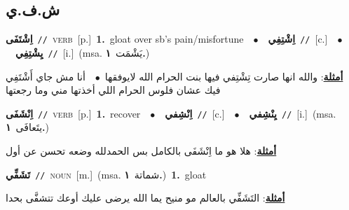 \documentclass[10pt,a4paper,twoside]{article} %
\begin{document}
\begin{multicols}{2}
\vspace{-3mm}
\subsection*{\color{blue}\foreignlanguage{arabic}{ش.ف.ي}\color{blue}{}} 

{\setlength\topsep{0pt}\textbf{\foreignlanguage{arabic}{اِشْتَفَى}}\ {\color{gray}\texttt{//}\color{black}}\ \textsc{verb}\ [p.]\ \textbf{1.}~gloat over sb's pain/misfortune\ \ $\bullet$\ \ \setlength\topsep{0pt}\textbf{\foreignlanguage{arabic}{اِشْتِفِي}}\ {\color{gray}\texttt{//}\color{black}}\ [c.]\ \ $\bullet$\ \ \setlength\topsep{0pt}\textbf{\foreignlanguage{arabic}{يِشْتِفِي}}\ {\color{gray}\texttt{//}\color{black}}\ [i.]\ \color{gray}(msa. \foreignlanguage{arabic}{يَشْمَت}~\foreignlanguage{arabic}{\textbf{١.}})\color{black}\  \begin{flushright}\color{gray}\foreignlanguage{arabic}{\textbf{\underline{\foreignlanguage{arabic}{أمثلة}}}: والله انها صارت تِشْتِفي فيها بنت الحرام الله لايوفقها\ $\bullet$\ \  أنا مش جاي أَشْتَفِي فيك عشان فلوس الحرام اللي أخذتها مني وما رجعتها}\end{flushright}\color{black}} \vspace{2mm}

{\setlength\topsep{0pt}\textbf{\foreignlanguage{arabic}{اِنْشَفَى}}\ {\color{gray}\texttt{//}\color{black}}\ \textsc{verb}\ [p.]\ \textbf{1.}~recover\ \ $\bullet$\ \ \setlength\topsep{0pt}\textbf{\foreignlanguage{arabic}{اِنْشِفي}}\ {\color{gray}\texttt{//}\color{black}}\ [c.]\ \ $\bullet$\ \ \setlength\topsep{0pt}\textbf{\foreignlanguage{arabic}{يِنْشِفي}}\ {\color{gray}\texttt{//}\color{black}}\ [i.]\ \color{gray}(msa. \foreignlanguage{arabic}{يتَعافَى}~\foreignlanguage{arabic}{\textbf{١.}})\color{black}\  \begin{flushright}\color{gray}\foreignlanguage{arabic}{\textbf{\underline{\foreignlanguage{arabic}{أمثلة}}}: هلا هو ما اِنْشَفَى بالكامل بس الحمدلله وضعه تحسن عن أول}\end{flushright}\color{black}} \vspace{2mm}

{\setlength\topsep{0pt}\textbf{\foreignlanguage{arabic}{تَشَفِّي}}\ {\color{gray}\texttt{//}\color{black}}\ \textsc{noun}\ [m.]\ \color{gray}(msa. \foreignlanguage{arabic}{شماتة}~\foreignlanguage{arabic}{\textbf{١.}})\color{black}\ \textbf{1.}~gloat\  \begin{flushright}\color{gray}\foreignlanguage{arabic}{\textbf{\underline{\foreignlanguage{arabic}{أمثلة}}}: التَشَفِّي بالعالم مو منيح يما الله يرضى عليك أوعك تتشفَّى بحدا}\end{flushright}\color{black}} \vspace{2mm}


\end{multicols}
\end{document}
